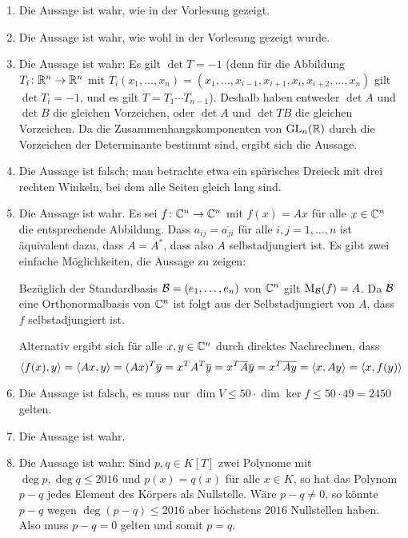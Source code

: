 \documentclass[a4paper,10pt]{scrartcl}
\begin{document}
\begin{solution}
  \begin{enumerate}[leftmargin=*]
    \item
      Die Aussage ist wahr, wie in der Vorlesung gezeigt.
    \item
      Die Aussage ist wahr, wie wohl in der Vorlesung gezeigt wurde.
    \item
      Die Aussage ist wahr:
      Es gilt $\det T = -1$ (denn für die Abbildung $T_i \colon \mathbb{R}^n \to \mathbb{R}^n$ mit $T_i(x_1, \dotsc, x_n) = (x_1, \dotsc, x_{i-1}, x_{i+1}, x_i, x_{i+2}, \dotsc, x_n)$ gilt $\det T_i = -1$, und es gilt $T = T_1 \dotsm T_{n-1}$).
      Deshalb haben entweder $\det A$ und $\det B$ die gleichen Vorzeichen, oder $\det A$ und $\det TB$ die gleichen Vorzeichen.
      Da die Zusammenhangskomponenten von $\mathrm{GL}_n(\mathbb{R})$ durch die Vorzeichen der Determinante bestimmt sind, ergibt sich die Aussage.
    \item
      Die Aussage ist falsch; man betrachte etwa ein spärisches Dreieck mit drei rechten Winkeln, bei dem alle Seiten gleich lang sind.
    \item
      Die Aussage ist wahr.
      Es sei $f \colon \mathbb{C}^n \to \mathbb{C}^n$ mit $f(x) = Ax$ für alle $x \in \mathbb{C}^n$ die entsprechende Abbildung.
      Dass $a_{ij} = \overline{a_{ji}}$ für alle $i,j = 1, \dotsc, n$ ist äquivalent dazu, dass $A = A^*$, dass also $A$ selbstadjungiert ist.
      Es gibt zwei einfache Möglichkeiten, die Aussage zu zeigen:
      
      Bezüglich der Standardbasis $\mathcal{B} = (e_1, \dotsc, e_n)$ von $\mathbb{C}^n$ gilt $\mathrm{M}_{\mathcal{B}}(f) = A$.
      Da $\mathcal{B}$ eine Orthonormalbasis von $\mathbb{C}^n$ ist folgt aus der Selbstadjungiert von $A$, dass $f$ selbstadjungiert ist.
      
      Alternativ ergibt sich für alle $x, y \in \mathbb{C}^n$ durch direktes Nachrechnen, dass
      \[
          \langle f(x), y \rangle
        = \langle A x, y \rangle
        = (A x)^T \overline{y}
        = x^T A^T \overline{y}
        = x^T \overline{A} \overline{y}
        = x^T \overline{A y}
        = \langle x, A y \rangle
        = \langle x, f(y) \rangle
      \]
    \item
      Die Aussage ist falsch, es muss nur $\dim V \leq 50 \cdot \dim \ker f \leq 50 \cdot 49 = 2450$ gelten.
    \item
      Die Aussage ist wahr.
    \item
      Die Aussage ist wahr:
      Sind $p, q \in K[T]$ zwei Polynome mit $\deg p, \deg q \leq 2016$ und $p(x) = q(x)$ für alle $x \in K$, so hat das Polynom $p - q$ jedes Element des Körpers als Nullstelle.
      Wäre $p - q \neq 0$, so könnte $p - q$ wegen $\deg (p-q) \leq 2016$ aber höchstens $2016$ Nullstellen haben.
      Also muss $p - q = 0$ gelten und somit $p = q$.
  \end{enumerate}
\end{solution}


\printsolutions
\end{document}
